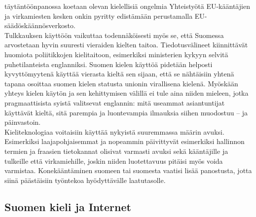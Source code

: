 \begin{multicols}{2}
täytäntöönpanossa koetaan olevan kielellisiä ongelmia
\cite{OECD2010} Yhteistyötä EU-kääntäjien ja virkamiesten kesken
onkin pyritty edistämään perustamalla EU-säädöskäännösverkosto.\\
Tulkkauksen käyttöön vaikuttaa todennäköisesti myös se, että Suomessa
arvostetaan hyvin suuresti vieraiden kielten taitoa. Tiedotusvälineet
kiinnittävät huomiota poliitikkojen kielitaitoon, esimerkiksi
ministerien kykyyn selvitä puhetilanteista englanniksi. Suomen kielen
käyttöä pidetään helposti kyvyttömyytenä käyttää vierasta kieltä sen
sijaan, että se nähtäisiin yhtenä tapana osoittaa suomen kielen
statusta unionin virallisena kielenä.  Myöskään yhteys kielen käytön
ja sen kehittymisen välillä ei tule aina niiden mieleen, jotka
pragmaattisista syistä valitsevat englannin: mitä useammat
asiantuntijat käyttävät kieltä, sitä parempia ja luontevampia
ilmauksia siihen muodostuu – ja päinvastoin.\\
Kieliteknologiaa voitaisiin käyttää nykyistä suuremmassa
määrin avuksi. Esimerkiksi laajapohjaisemmat ja nopeammin päivittyvät
esimerkiksi hallinnon termien ja fraasien tietokannat olisivat
varmasti avuksi sekä kääntäjille ja tulkeille että virkamiehille,
joskin niiden luotettavuus pitäisi myös voida varmistaa.
Konekääntäminen suomeen tai suomesta vaatisi lisää panostusta, jotta
siinä päästäisiin työntekoa hyödyttävälle laatutasolle.



\subsection{Suomen kieli ja Internet}


\end{multicols}
